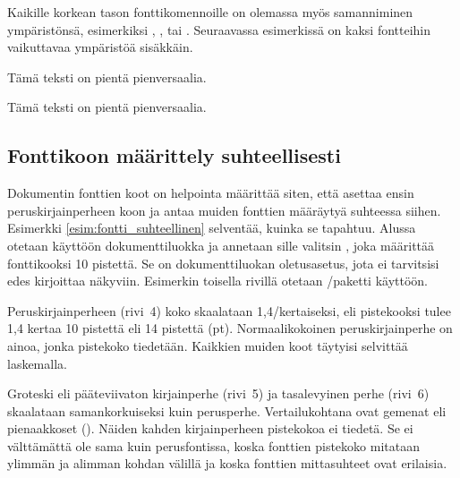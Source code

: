 Kaikille korkean tason fonttikomennoille on olemassa myös samanniminen
ympäristönsä, esimerkiksi , ,
 tai . Seuraavassa esimerkissä on
kaksi fontteihin vaikuttavaa ympäristöä sisäkkäin.

\begin{koodilohkosis}
  \begin{footnotesize}
    \begin{scshape}
      Tämä teksti on pientä pienversaalia.
    \end{scshape}
  \end{footnotesize}
\end{koodilohkosis}

\begin{tulossis}
  \begin{footnotesize}
    \begin{scshape}
      Tämä teksti on pientä pienversaalia.
    \end{scshape}
  \end{footnotesize}
\end{tulossis}

\subsection{Fonttikoon määrittely suhteellisesti}
\label{luku:fontti_suhteellinen}

Dokumentin fonttien koot on helpointa määrittää siten, että asettaa
ensin peruskirjainperheen koon ja antaa muiden fonttien määräytyä
suhteessa siihen. Esimerkki \ref{esim:fontti_suhteellinen} selventää,
kuinka se tapahtuu. Alussa otetaan käyttöön dokumenttiluokka
 ja annetaan sille valitsin \koodi{10pt}, joka määrittää
fonttikooksi 10 pistettä. Se on dokumenttiluokan oletusasetus, jota ei
tarvitsisi edes kirjoittaa näkyviin. Esimerkin toisella rivillä otetaan
\-/paketti käyttöön.

Peruskirjainperheen (rivi~4) koko skaalataan 1,4\-/kertaiseksi, eli
pistekooksi tulee 1,4 kertaa 10 pistettä eli 14 pistettä (pt).
Normaalikokoinen peruskirjainperhe on ainoa, jonka pistekoko tiedetään.
Kaikkien muiden koot täytyisi selvittää laskemalla.

Groteski eli pääteviivaton kirjainperhe (rivi~5) ja tasalevyinen perhe
(rivi~6) skaalataan samankorkuiseksi kuin perusperhe. Vertailukohtana
ovat gemenat eli pienaakkoset (). Näiden kahden
kirjainperheen pistekokoa ei tiedetä. Se ei välttämättä ole sama kuin
perusfontissa, koska fonttien pistekoko mitataan ylimmän ja alimman
kohdan välillä ja koska fonttien mittasuhteet ovat erilaisia.

